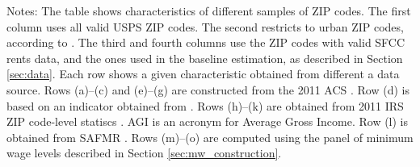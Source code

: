 \begin{landscape}
\begin{table}[hbt!]
    \begin{minipage}{.95\linewidth} \footnotesize
        \vspace{2mm}
        Notes: The table shows characteristics of different samples of ZIP codes.
        The first column uses all valid USPS ZIP codes.
        The second restricts to urban ZIP codes, according to \textcite{MissouriCDC}.
        The third and fourth columns use the ZIP codes with valid SFCC rents 
        data, and the ones used in the baseline estimation, as described in
        Section \ref{sec:data}.
        Each row shows a given characteristic obtained from different a data 
        source.
        Rows (a)--(c) and (e)--(g) are constructed from the 2011 ACS 
        \textcite{ACS}.
        Row (d) is based on an indicator obtained from \textcite{MissouriCDC}.
        Rows (h)--(k) are obtained from 2011 IRS ZIP code-level statiscs 
        \textcite{IRS}.
        AGI is an acronym for Average Gross Income.
        Row (l) is obtained from SAFMR \textcite{hudSAFMR}.
        Rows (m)--(o) are computed using the panel of minimum wage levels 
        described in Section \ref{sec:mw_construction}.
    \end{minipage}
\end{table}
\end{landscape}

